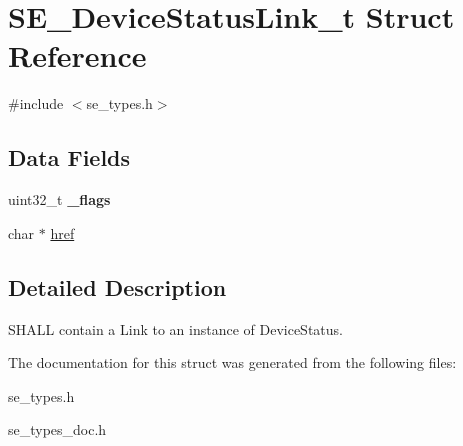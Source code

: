 \hypertarget{structSE__DeviceStatusLink__t}{}\section{S\+E\+\_\+\+Device\+Status\+Link\+\_\+t Struct Reference}
\label{structSE__DeviceStatusLink__t}


{\ttfamily \#include $<$se\+\_\+types.\+h$>$}

\subsection*{Data Fields}
\begin{DoxyCompactItemize}
\item 
uint32\+\_\+t {\bfseries \+\_\+flags}
\item 
char $\ast$ \hyperlink{group__DeviceStatusLink_ga22a45171b095064aa3aa29c717a11915}{href}
\end{DoxyCompactItemize}


\subsection{Detailed Description}
S\+H\+A\+LL contain a Link to an instance of Device\+Status. 

The documentation for this struct was generated from the following files\+:\begin{DoxyCompactItemize}
\item 
se\+\_\+types.\+h\item 
se\+\_\+types\+\_\+doc.\+h\end{DoxyCompactItemize}

